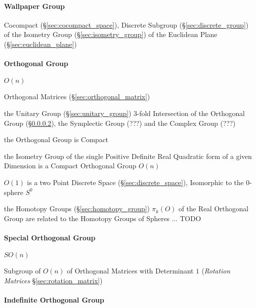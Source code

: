 \paragraph{Wallpaper Group}\label{sec:wallpaper_group}\hfill

Cocompact (\S\ref{sec:cocompact_space}), Discrete Subgroup
(\S\ref{sec:discrete_group}) of the Isometry Group (\S\ref{sec:isometry_group})
of the Euclidean Plane (\S\ref{sec:euclidean_plane})



\paragraph{Orthogonal Group}\label{sec:orthogonal_group}\hfill

$O(n)$

Orthogonal Matrices (\S\ref{sec:orthogonal_matrix})

the Unitary Group (\S\ref{sec:unitary_group}) 3-fold Intersection of the
Orthogonal Group (\S\ref{sec:orthogonal_group}), the Symplectic Group (???) and
the Complex Group (???) %

the Orthogonal Group is Compact

the Isometry Group of the single Positive Definite Real Quadratic form of a
given Dimension is a Compact Orthogonal Group $O(n)$

$O(1)$ is a two Point Discrete Space (\S\ref{sec:discrete_space}), Isomorphic
to the $0$-sphere $S^0$

the Homotopy Groups (\S\ref{sec:homotopy_group}) $\pi_k(O)$ of the Real
Orthogonal Group are related to the Homotopy Groups of Spheres
... TODO



\paragraph{Special Orthogonal Group}\label{sec:special_orthogonal_group}\hfill

$SO(n)$

Subgroup of $O(n)$ of Orthogonal Matrices with Determinant $1$ (\emph{Rotation
  Matrices} \S\ref{sec:rotation_matrix})



\paragraph{Indefinite Orthogonal Group}
\label{sec:indefinite_orthogonal_group}\hfill

